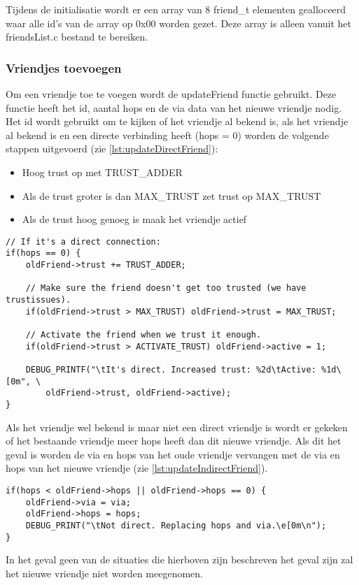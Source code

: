         Tijdens de initialisatie wordt er een array van 8 friend\_t elementen gealloceerd waar alle id's van de array op 0x00 worden gezet. Deze array is alleen vanuit het friendsList.c bestand te bereiken.

    \subsubsection{Vriendjes toevoegen}
        Om een vriendje toe te voegen wordt de updateFriend functie gebruikt. Deze functie heeft het id, aantal hops en de via data van het nieuwe vriendje nodig. Het id wordt gebruikt om te kijken of het vriendje al bekend is, als het vriendje al bekend is en een directe verbinding heeft (hops = 0) worden de volgende stappen uitgevoerd (zie \autoref{lst:updateDirectFriend}):
        \begin{itemize}
            \item Hoog trust op met TRUST\_ADDER
            \item Als de trust groter is dan MAX\_TRUST zet trust op MAX\_TRUST
            \item Als de trust hoog genoeg is maak het vriendje actief
        \end{itemize}
\begin{lstlisting}[caption={Update direct vriendje},captionpos=b,label={lst:updateDirectFriend},style=c,xleftmargin=.\textwidth,xrightmargin=.\textwidth]
// If it's a direct connection:
if(hops == 0) {
    oldFriend->trust += TRUST_ADDER;

    // Make sure the friend doesn't get too trusted (we have trustissues).
    if(oldFriend->trust > MAX_TRUST) oldFriend->trust = MAX_TRUST;

    // Activate the friend when we trust it enough.
    if(oldFriend->trust > ACTIVATE_TRUST) oldFriend->active = 1;

    DEBUG_PRINTF("\tIt's direct. Increased trust: %2d\tActive: %1d\[0m", \ 
        oldFriend->trust, oldFriend->active);
}
\end{lstlisting}
        Als het vriendje wel bekend is maar niet een direct vriendje is wordt er gekeken of het bestaande vriendje meer hops heeft dan dit nieuwe vriendje. Als dit het geval is worden de via en hops van het oude vriendje vervangen met de via en hops van het nieuwe vriendje (zie \autoref{lst:updateIndirectFriend}). 
\begin{lstlisting}[caption={Update indirect vriendje},captionpos=b,label={lst:updateIndirectFriend},style=c,xleftmargin=.\textwidth,xrightmargin=.\textwidth]
if(hops < oldFriend->hops || oldFriend->hops == 0) {
    oldFriend->via = via;
    oldFriend->hops = hops;
    DEBUG_PRINT("\tNot direct. Replacing hops and via.\e[0m\n");
}
\end{lstlisting}
        In het geval geen van de situaties die hierboven zijn beschreven het geval zijn zal het nieuwe vriendje niet worden meegenomen.
